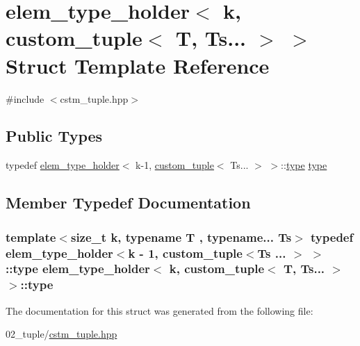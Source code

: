\hypertarget{structelem__type__holder_3_01k_00_01custom__tuple_3_01T_00_01Ts_8_8_8_01_4_01_4}{}\section{elem\+\_\+type\+\_\+holder$<$ k, custom\+\_\+tuple$<$ T, Ts... $>$ $>$ Struct Template Reference}
\label{structelem__type__holder_3_01k_00_01custom__tuple_3_01T_00_01Ts_8_8_8_01_4_01_4}


{\ttfamily \#include $<$cstm\+\_\+tuple.\+hpp$>$}

\subsection*{Public Types}
\begin{DoxyCompactItemize}
\item 
typedef \hyperlink{structelem__type__holder}{elem\+\_\+type\+\_\+holder}$<$ k-\/1, \hyperlink{structcustom__tuple}{custom\+\_\+tuple}$<$ Ts... $>$ $>$\+::\hyperlink{structelem__type__holder_3_01k_00_01custom__tuple_3_01T_00_01Ts_8_8_8_01_4_01_4_ab3b1bf71db4e249545297ee87ba43659}{type} \hyperlink{structelem__type__holder_3_01k_00_01custom__tuple_3_01T_00_01Ts_8_8_8_01_4_01_4_ab3b1bf71db4e249545297ee87ba43659}{type}
\end{DoxyCompactItemize}


\subsection{Member Typedef Documentation}
\subsubsection[{\texorpdfstring{type}{type}}]{\setlength{\rightskip}{0pt plus 5cm}template$<$size\+\_\+t k, typename T , typename... Ts$>$ typedef {\bf elem\+\_\+type\+\_\+holder}$<$k -\/ 1, {\bf custom\+\_\+tuple}$<$Ts ... $>$ $>$\+::{\bf type} {\bf elem\+\_\+type\+\_\+holder}$<$ k, {\bf custom\+\_\+tuple}$<$ T, Ts... $>$ $>$\+::{\bf type}}\hypertarget{structelem__type__holder_3_01k_00_01custom__tuple_3_01T_00_01Ts_8_8_8_01_4_01_4_ab3b1bf71db4e249545297ee87ba43659}{}\label{structelem__type__holder_3_01k_00_01custom__tuple_3_01T_00_01Ts_8_8_8_01_4_01_4_ab3b1bf71db4e249545297ee87ba43659}


The documentation for this struct was generated from the following file\+:\begin{DoxyCompactItemize}
\item 
02\+\_\+tuple/\hyperlink{cstm__tuple_8hpp}{cstm\+\_\+tuple.\+hpp}\end{DoxyCompactItemize}
